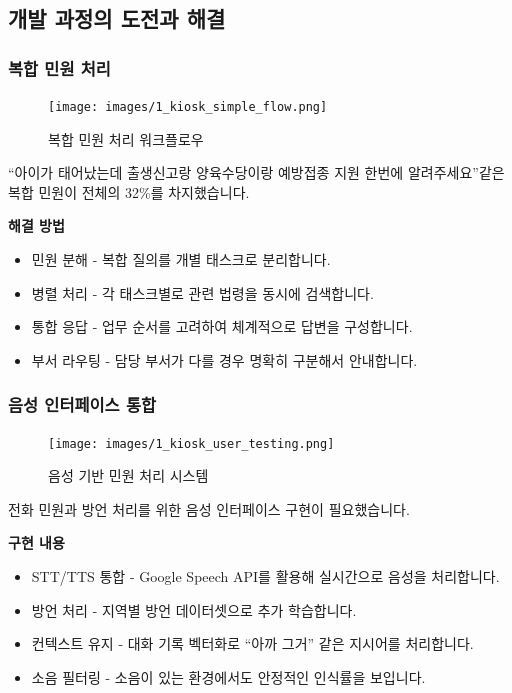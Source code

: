 \subsection{개발 과정의 도전과 해결}

\subsubsection{복합 민원 처리}

\begin{figure}[H]
    \centering
    \texttt{[image: images/1\_kiosk\_simple\_flow.png]}
    \caption{복합 민원 처리 워크플로우}
    \label{fig:kiosk_simple_flow}
\end{figure}

``아이가 태어났는데 출생신고랑 양육수당이랑 예방접종 지원 한번에 알려주세요''같은 복합 민원이 전체의 32\%를 차지했습니다.

\textbf{해결 방법}
\begin{itemize}
    \item 민원 분해
            - 복합 질의를 개별 태스크로 분리합니다.
    \item 병렬 처리
            - 각 태스크별로 관련 법령을 동시에 검색합니다.
    \item 통합 응답
            - 업무 순서를 고려하여 체계적으로 답변을 구성합니다.
    \item 부서 라우팅
            - 담당 부서가 다를 경우 명확히 구분해서 안내합니다.
\end{itemize}

\subsubsection{음성 인터페이스 통합}

\begin{figure}[H]
    \centering
    \texttt{[image: images/1\_kiosk\_user\_testing.png]}
    \caption{음성 기반 민원 처리 시스템}
    \label{fig:kiosk_user_testing}
\end{figure}

전화 민원과 방언 처리를 위한 음성 인터페이스 구현이 필요했습니다.

\textbf{구현 내용}
\begin{itemize}
    \item STT/TTS 통합
            - Google Speech API를 활용해 실시간으로 음성을 처리합니다.
    \item 방언 처리
            - 지역별 방언 데이터셋으로 추가 학습합니다.
    \item 컨텍스트 유지
            - 대화 기록 벡터화로 ``아까 그거'' 같은 지시어를 처리합니다.
    \item 소음 필터링
            - 소음이 있는 환경에서도 안정적인 인식률을 보입니다.
\end{itemize}

